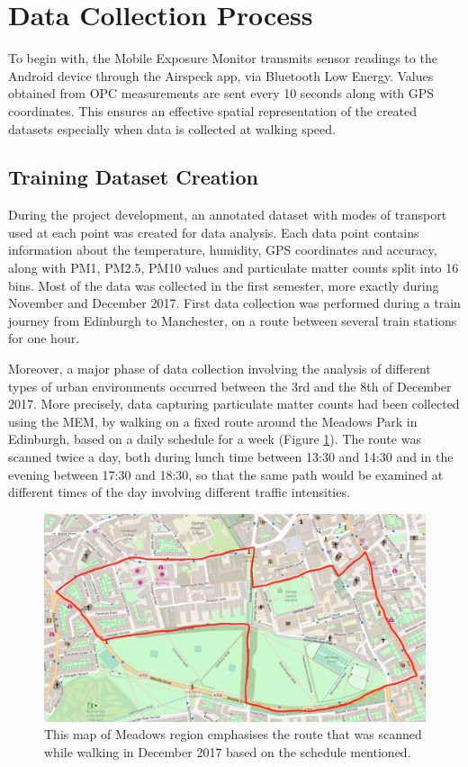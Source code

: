 \documentclass[bsc,frontabs,twoside,singlespacing, parskip,deptreport]{infthesis}     %
\begin{document}
\section{Data Collection Process}
\label{sec:data-collection}

To begin with, the Mobile Exposure Monitor transmits sensor readings to the Android device through the Airspeck app, via Bluetooth Low Energy. Values obtained from OPC measurements are sent every 10 seconds along with GPS coordinates. This ensures an effective spatial representation of the created datasets especially when data is collected at walking speed.

\subsection{Training Dataset Creation}
\label{subsec:training-dataset}

During the project development, an annotated dataset with modes of transport used at each point was created for data analysis. Each data point contains information about the temperature, humidity, GPS coordinates and accuracy, along with PM1, PM2.5, PM10 values and particulate matter counts split into 16 bins. Most of the data was collected in the first semester, more exactly during November and December 2017. First data collection was performed during a train journey from Edinburgh to Manchester, on a route between several train stations for one hour.

Moreover, a major phase of data collection involving the analysis of different types of urban environments occurred between the 3rd and the 8th of December 2017. More precisely, data capturing particulate matter counts had been collected using the MEM, by walking on a fixed route around the Meadows Park in Edinburgh, based on a daily schedule for a week (Figure \ref{fig:december_route}). The route was scanned twice a day, both during lunch time between 13:30 and 14:30 and in the evening between 17:30 and 18:30, so that the same path would be examined at different times of the day involving different traffic intensities.

\begin{figure}[h]
  \center
  \includegraphics[width=\columnwidth]{december_route.png} 
  \caption{This map of Meadows region emphasises the route that was scanned while walking in December 2017 based on the schedule mentioned.}
  \label{fig:december_route}
\end{figure}
\end{document}
